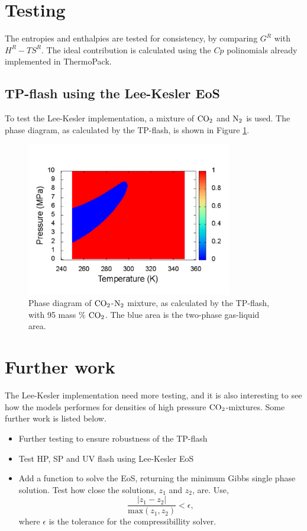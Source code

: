 \documentclass[internal,english]{sintefmemo2012}
\numberwithin{equation}{section}
\newcommand*{\coto}{\ensuremath{\text{CO}_{\text{\scriptsize
        2}}}\xspace}
\newcommand*{\nto}{\ensuremath{\text{N}_{\text{\scriptsize
        2}}}\xspace}
\begin{document}
\section{Testing}
The entropies and enthalpies are tested for consistency, by comparing
$G^R$ with $H^R-TS^R$. The ideal contribution is calculated using the
$Cp$ polinomials already implemented in ThermoPack. 
\subsection{TP-flash using the Lee-Kesler EoS}
To test the Lee-Kesler implementation, a mixture of \coto and \nto is
used. The phase diagram, as calculated by the TP-flash, is shown in
Figure \ref{fig:co2n2}.
\begin{figure}[h]
  \centering
  \includegraphics[width=0.8\textwidth]{co2n2}
  \caption{Phase diagram of \coto-\nto mixture, as calculated by the TP-flash,
  with 95 mass \% \coto. The blue area is the two-phase gas-liquid area.}
  \label{fig:co2n2}
\end{figure}

\section{Further work}
The Lee-Kesler implementation need more testing, and it is also
interesting to see how the models performes for densities of high
pressure \coto-mixtures. Some further work is listed below.
\begin{itemize}
\item Further testing to ensure robustness of the TP-flash
\item Test HP, SP and UV flash using Lee-Kesler EoS
\item Add a function to solve the EoS, returning the minimum Gibbs
  single phase solution. Test how close the solutions, $z_1$ and
  $z_2$, are. Use,
  \begin{equation}
    \frac{|z_1-z_2|}{\text{max}(z_1,z_2)} < \epsilon,
  \end{equation}
  where $\epsilon$ is the tolerance for the compressibillity solver.
\end{itemize}
\end{document}
